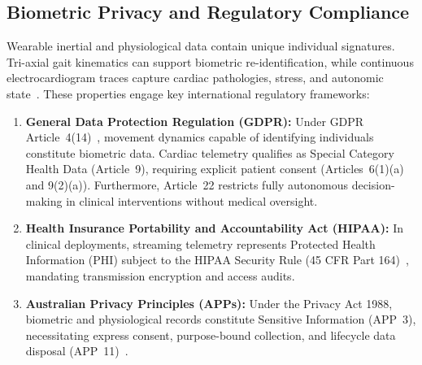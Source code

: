\documentclass[10pt,twocolumn]{article}
\begin{document}
\subsection{Biometric Privacy and Regulatory Compliance}
Wearable inertial and physiological data contain unique individual signatures. Tri-axial gait kinematics can support biometric re-identification, while continuous electrocardiogram traces capture cardiac pathologies, stress, and autonomic state~\cite{bulling2014tutorial}. These properties engage key international regulatory frameworks:
\begin{enumerate}
    \item \textbf{General Data Protection Regulation (GDPR):} Under GDPR Article~4(14)~\cite{gdpr2016}, movement dynamics capable of identifying individuals constitute biometric data. Cardiac telemetry qualifies as Special Category Health Data (Article~9), requiring explicit patient consent (Articles~6(1)(a) and 9(2)(a)). Furthermore, Article~22 restricts fully autonomous decision-making in clinical interventions without medical oversight.
    \item \textbf{Health Insurance Portability and Accountability Act (HIPAA):} In clinical deployments, streaming telemetry represents Protected Health Information (PHI) subject to the HIPAA Security Rule (45 CFR Part 164)~\cite{hipaa1996}, mandating transmission encryption and access audits.
    \item \textbf{Australian Privacy Principles (APPs):} Under the Privacy Act 1988, biometric and physiological records constitute Sensitive Information (APP~3), necessitating express consent, purpose-bound collection, and lifecycle data disposal (APP~11)~\cite{oaic_app_2021}.
\end{enumerate}
\end{document}
